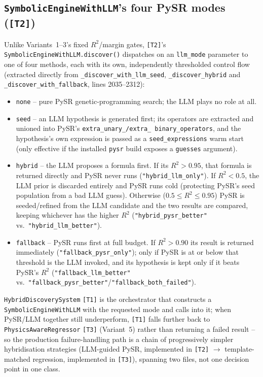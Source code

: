 \documentclass[11pt,a4paper]{article}
\newcommand{\code}[1]{\texttt{\small #1}}
\begin{document}
\subsection{\code{SymbolicEngineWithLLM}'s four PySR modes (\code{[T2]})}
Unlike Variants~1--3's fixed $R^2$/margin gates, \code{[T2]}'s
\code{SymbolicEngineWithLLM.discover()} dispatches on an \code{llm\_mode}
parameter to one of four methods, each with its own, independently
thresholded control flow (extracted directly from
\code{\_discover\_with\_llm\_seed}, \code{\_discover\_hybrid} and
\code{\_discover\_with\_fallback}, lines 2035--2312):
\begin{itemize}
  \item \code{none} -- pure PySR genetic-programming search; the LLM plays
        no role at all.
  \item \code{seed} -- an LLM hypothesis is generated first; its operators
        are extracted and unioned into PySR's \code{extra\_unary\_/extra\_
        binary\_operators}, and the hypothesis's own expression is passed
        as a \code{seed\_expressions} warm start (only effective if the
        installed \code{pysr} build exposes a \code{guesses} argument).
  \item \code{hybrid} -- the LLM proposes a formula first. If its $R^2>0.95$,
        that formula is returned directly and PySR never runs
        (\code{"hybrid\_llm\_only"}). If $R^2<0.5$, the LLM prior is
        discarded entirely and PySR runs cold (protecting PySR's seed
        population from a bad LLM guess). Otherwise ($0.5\leq R^2\leq0.95$)
        PySR is seeded/refined from the LLM candidate and the two results
        are compared, keeping whichever has the higher $R^2$
        (\code{"hybrid\_pysr\_better"} vs.\ \code{"hybrid\_llm\_better"}).
  \item \code{fallback} -- PySR runs first at full budget. If
        $R^2>0.90$ its result is returned immediately
        (\code{"fallback\_pysr\_only"}); only if PySR is at or below that
        threshold is the LLM invoked, and its hypothesis is kept only if it
        beats PySR's $R^2$ (\code{"fallback\_llm\_better"} vs.\
        \code{"fallback\_pysr\_better"}/\code{"fallback\_both\_failed"}).
\end{itemize}
\code{HybridDiscoverySystem} \code{[T1]} is the orchestrator that
constructs a \code{SymbolicEngineWithLLM} with the requested mode and calls
into it; when PySR/LLM together still underperform, \code{[T1]} falls
further back to \code{PhysicsAwareRegressor} \code{[T3]} (Variant~5) rather
than returning a failed result -- so the production failure-handling path
is a chain of progressively simpler hybridisation strategies (LLM-guided
PySR, implemented in \code{[T2]} $\to$ template-matched regression,
implemented in \code{[T3]}), spanning two files, not one decision point in
one class.
\end{document}
